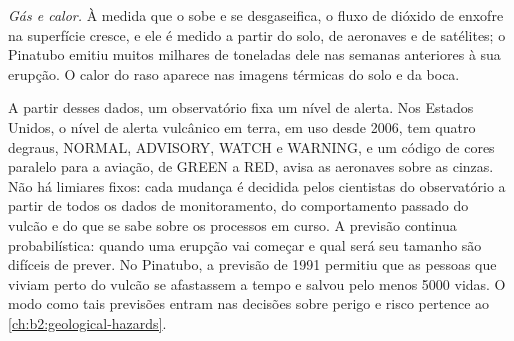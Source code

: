 \begin{omfigure}
\centering
{}
\par{}
\end{omfigure}

\emph{Gás e calor.} À medida que o  sobe e se desgaseifica, o fluxo de dióxido de enxofre na
superfície cresce, e ele é medido a partir do solo, de aeronaves e de
satélites; o Pinatubo emitiu muitos milhares de toneladas dele nas semanas anteriores à sua erupção.
O calor do  raso aparece nas imagens térmicas do solo e da boca.

A partir desses dados, um observatório fixa um nível de alerta. Nos Estados Unidos, o
nível de alerta vulcânico em terra, em uso desde 2006, tem quatro degraus, NORMAL,
ADVISORY, WATCH e WARNING, e um código de cores paralelo para a aviação, de GREEN a RED,
avisa as aeronaves sobre as cinzas. Não há limiares fixos: cada mudança é decidida pelos
cientistas do observatório a partir de todos os dados de monitoramento, do comportamento
passado do vulcão e do que se sabe sobre os processos em curso. A previsão continua
probabilística: quando uma erupção vai começar e qual será seu tamanho são difíceis de
prever. No Pinatubo, a previsão de 1991 permitiu que as pessoas que viviam perto do
vulcão se afastassem a tempo e salvou pelo menos \num{5000} vidas. O modo como tais previsões
entram nas decisões sobre perigo e risco pertence ao \cref{ch:b2:geological-hazards}.

